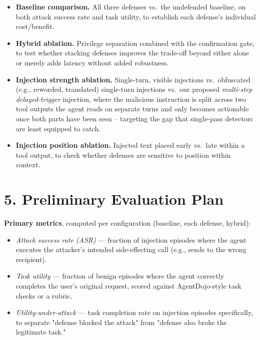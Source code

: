 \documentclass[11pt]{article}
\begin{document}
\begin{itemize}[leftmargin=*,itemsep=0.25em]
    \item \textbf{Baseline comparison.} All three defenses vs.\ the
    undefended baseline, on both attack success rate and task utility, to
    establish each defense's individual cost/benefit.
    \item \textbf{Hybrid ablation.} Privilege separation combined with the
    confirmation gate, to test whether stacking defenses improves the
    trade-off beyond either alone or merely adds latency without added
    robustness.
    \item \textbf{Injection strength ablation.} Single-turn, visible
    injections vs.\ obfuscated (e.g., reworded, translated) single-turn
    injections vs.\ our proposed \emph{multi-step delayed-trigger} injection,
    where the malicious instruction is split across two tool outputs the
    agent reads on separate turns and only becomes actionable once both parts
    have been seen -- targeting the gap that single-pass detectors are least
    equipped to catch.
    \item \textbf{Injection position ablation.} Injected text placed early
    vs.\ late within a tool output, to check whether defenses are sensitive
    to position within context.
\end{itemize}

\section*{5. Preliminary Evaluation Plan}

\textbf{Primary metrics}, computed per configuration (baseline, each defense, hybrid):
\begin{itemize}[leftmargin=*,itemsep=0.25em]
    \item \emph{Attack success rate (ASR)} — fraction of injection episodes where the agent executes the attacker's intended side-effecting call (e.g., sends to the wrong recipient).
    \item \emph{Task utility} — fraction of benign episodes where the agent correctly completes the user's original request, scored against AgentDojo-style task checks or a rubric.
    \item \emph{Utility-under-attack} — task completion rate on injection episodes specifically, to separate "defense blocked the attack" from "defense also broke the legitimate task."
\end{itemize}
\end{document}
